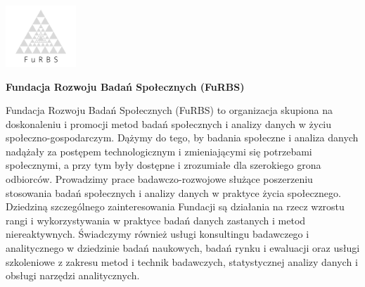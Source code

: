 \documentclass[\main/boa.tex]{subfiles}
\begin{document}
	
	\begin{minipage}[t]{0.915\textwidth}
		\center     
		\includegraphics[width=100px]{img/logos.bw/furbs.png} 
	\end{minipage}
	\begin{center}
	\Large \textbf {Fundacja Rozwoju Badań Społecznych (FuRBS)}
	\end{center}
	
	\vskip 0.3cm
	\normalsize 
	Fundacja Rozwoju Badań Społecznych (FuRBS) to organizacja skupiona na doskonaleniu i promocji metod badań społecznych i analizy danych w życiu społeczno-gospodarczym. Dążymy do tego, by badania społeczne i analiza danych nadążały za postępem technologicznym i zmieniającymi się potrzebami społecznymi, a przy tym były dostępne i zrozumiałe dla szerokiego grona odbiorców. Prowadzimy prace badawczo-rozwojowe służące poszerzeniu stosowania badań społecznych i analizy danych w praktyce życia społecznego. Dziedziną szczególnego zainteresowania Fundacji są działania na rzecz wzrostu rangi i wykorzystywania w praktyce badań danych zastanych i metod niereaktywnych. Świadczymy również usługi konsultingu badawczego i analitycznego w dziedzinie badań naukowych, badań rynku i ewaluacji oraz usługi szkoleniowe z zakresu metod i technik badawczych, statystycznej analizy danych i obsługi narzędzi analitycznych.
	
	\vskip 1.5cm
\end{document}

